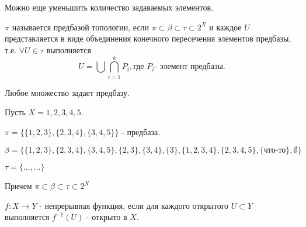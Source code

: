 Можно еще уменьшить количество задаваемых элементов.

\begin{definition}
    $\pi$ называется предбазой топологии, если $\pi \subset \beta \subset \tau \subset 2^X$ и каждое $U$ представляется в виде объединения конечного пересечения элементов предбазы, т.е. $\forall U \in \tau$ выполняется
    \[
        U = \bigcup \bigcap_{i = 1}^k P_i, \text{где } P_i \text{- элемент предбазы}.
    \]
\end{definition}

\begin{nota_bene}
    Любое множество задает предбазу.
\end{nota_bene}

\wip
\begin{example}
    Пусть $X = {1,2,3,4,5}$.

    $\pi = \{\{1,2,3\}, \{2,3,4\}, \{3,4,5\}\}$ - предбаза.

    $\beta = \{\{1,2,3\}, \{2,3,4\}, \{3,4,5\}, \{2,3\}, \{3,4\}, \{3\}, \{1,2,3,4\}, \{2,3,4,5\}, \{\textbf{что-то}\}, \emptyset\}$

    $\tau = \{\ldots, \ldots\}$

    Причем $\pi \subset \beta \subset \tau \subset 2^X$
\end{example}

\begin{definition}
    $f: X \rightarrow Y$ - непрерывная функция, если для каждого открытого $U \subset Y$ выполняется $f^{-1}(U)$ - открыто в $X$.
\end{definition}
